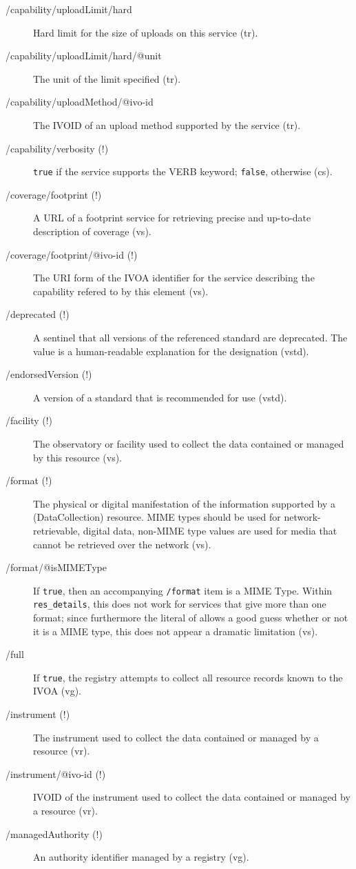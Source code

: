 \documentclass[11pt,a4paper]{ivoa}
\newcommand{\rtent}[1]{\texttt{\color{rtcolor} #1}}
\begin{document}
\begin{description}
\item[/capability/uploadLimit/hard]Hard limit for the size of uploads on this service (tr).
\item[/capability/uploadLimit/hard/@unit]The unit of the limit specified (tr).
\item[/capability/uploadMethod/@ivo-id]The IVOID of an upload method supported by the service (tr).
\item[/capability/verbosity (!)]\texttt{true} if the service supports the VERB keyword; \texttt{false}, otherwise (cs).
\item[/coverage/footprint (!)]A URL of a footprint service for retrieving precise and up-to-date description of coverage (vs).
\item[/coverage/footprint/@ivo-id (!)]The URI form of the IVOA identifier for the service describing the capability refered to by this element (vs).
\item[/deprecated (!)]A sentinel that all versions of the referenced standard are deprecated. The value is a human-readable explanation for the designation (vstd).
\item[/endorsedVersion (!)]A version of a standard that is recommended for use (vstd).
\item[/facility (!)]The observatory or facility used to collect the data contained or managed by this resource (vs).
\item[/format (!)]The physical or digital manifestation of the information supported by a (DataCollection) resource.  MIME types should be used for network-retrievable, digital data, non-MIME type values are used for media that cannot be retrieved over the network (vs).
\item[/format/@isMIMEType]If \texttt{true}, then an accompanying \texttt{/format} item is a MIME Type. Within \rtent{res\_details}, this does not work for services that give more than one format; since furthermore the literal of  allows a good guess whether or not it is a MIME type, this does not appear a dramatic limitation (vs).
\item[/full]If \verb|true|, the registry attempts to collect all resource records known to the IVOA (vg).
\item[/instrument (!)]The instrument used to collect the data contained or managed by a resource (vr).
\item[/instrument/@ivo-id (!)]IVOID of the instrument used to collect the data contained or managed by a resource (vr).
\item[/managedAuthority (!)]An authority identifier managed by a registry (vg).

\end{description}
\end{document}
